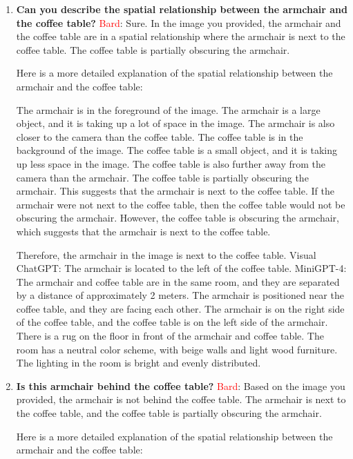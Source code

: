 \begin{enumerate}
    \item \textbf{Can you describe the spatial relationship between the armchair and the coffee table?}
    \subitem \textcolor{Red}{Bard}: 
    Sure. In the image you provided, the armchair and the coffee table are in a spatial relationship where the armchair is next to the coffee table. The coffee table is partially obscuring the armchair.
    
    Here is a more detailed explanation of the spatial relationship between the armchair and the coffee table:
    
    The armchair is in the foreground of the image. The armchair is a large object, and it is taking up a lot of space in the image. The armchair is also closer to the camera than the coffee table.
    The coffee table is in the background of the image. The coffee table is a small object, and it is taking up less space in the image. The coffee table is also further away from the camera than the armchair.
    The coffee table is partially obscuring the armchair. This suggests that the armchair is next to the coffee table.
    If the armchair were not next to the coffee table, then the coffee table would not be obscuring the armchair. However, the coffee table is obscuring the armchair, which suggests that the armchair is next to the coffee table.
    
    Therefore, the armchair in the image is next to the coffee table.
    \subitem Visual ChatGPT: The armchair is located to the left of the coffee table.
    \subitem MiniGPT-4: The armchair and coffee table are in the same room, and they are separated by a distance of approximately 2 meters. The armchair is positioned near the coffee table, and they are facing each other. The armchair is on the right side of the coffee table, and the coffee table is on the left side of the armchair. There is a rug on the floor in front of the armchair and coffee table. The room has a neutral color scheme, with beige walls and light wood furniture. The lighting in the room is bright and evenly distributed.
    \item \textbf{Is this armchair behind the coffee table?}
    \subitem \textcolor{Red}{Bard}: Based on the image you provided, the armchair is not behind the coffee table. The armchair is next to the coffee table, and the coffee table is partially obscuring the armchair.

    Here is a more detailed explanation of the spatial relationship between the armchair and the coffee table:
    

\end{enumerate}
